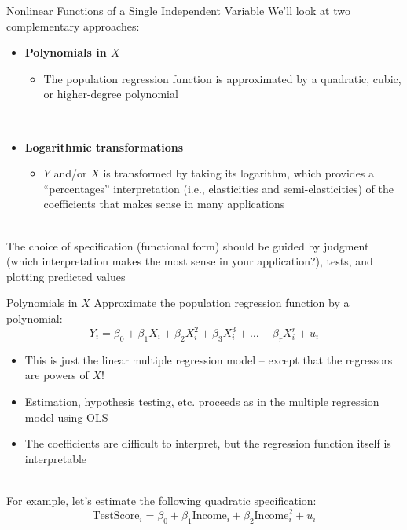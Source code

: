 \documentclass[notes,10pt, aspectratio=169]{beamer}
\begin{document}
\begin{frame}{Nonlinear Functions of a Single Independent Variable}
We’ll look at two complementary approaches:\\[1em]

\begin{itemize}
    \item \textbf{Polynomials in $X$}
    \begin{itemize}
        \item The population regression function is approximated by a quadratic, cubic, or higher-degree polynomial
    \end{itemize}
    \\[1em]
    \item \textbf{Logarithmic transformations}
    \begin{itemize}
        \item $Y$ and/or $X$ is transformed by taking its logarithm, which provides a ``percentages'' interpretation (i.e., elasticities and semi-elasticities) of the coefficients that makes sense in many applications
    \end{itemize}
\end{itemize}\\[1em]
    The choice of specification (functional form) should be guided by judgment (which interpretation makes the most sense in your application?), tests, and plotting predicted values
\end{frame}


\begin{frame}{Polynomials in $X$}
Approximate the population regression function by a polynomial:
\begin{equation*}
    Y_i = \beta_0 + \beta_1 X_i + \beta_2 X_i^2 + \beta_3 X_i^3 + \dots + \beta_r X_i^r + u_i
\end{equation*}
\begin{itemize}
    \item This is just the linear multiple regression model -- except that the regressors are powers of $X$!
    \item  Estimation, hypothesis testing, etc. proceeds as in the multiple regression model using OLS
    \item The coefficients are difficult to interpret, but the regression function itself is interpretable
\end{itemize}\\[1em]

For example, let's estimate the following quadratic specification:
\begin{equation*}
    \text{TestScore}_i = \beta_0 + \beta_1 \text{Income}_i + \beta_2 \text{Income}_i^2  + u_i
\end{equation*}
\end{frame}
\end{document}
